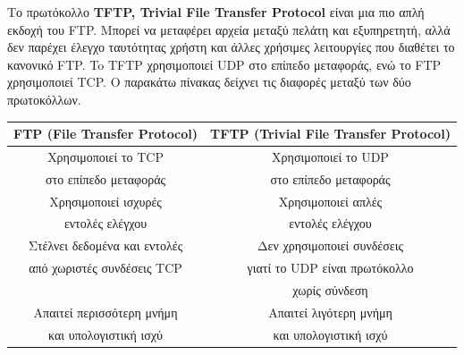 Το πρωτόκολλο \textbf{TFTP, Trivial File Transfer Protocol} είναι μια πιο απλή εκδοχή του FTP. Μπορεί να μεταφέρει αρχεία μεταξύ πελάτη και εξυπηρετητή, αλλά δεν παρέχει έλεγχο ταυτότητας χρήστη και άλλες χρήσιμες λειτουργίες που διαθέτει το κανονικό FTP. To TFTP χρησιμοποιεί UDP στο επίπεδο μεταφοράς, ενώ το FTP χρησιμοποιεί TCP. O παρακάτω πίνακας δείχνει τις διαφορές μεταξύ των δύο πρωτοκόλλων.

\begin{tabular}{|c|c|}
\hline
\textbf{FTP (File Transfer Protocol)} & \textbf{TFTP (Trivial File Transfer Protocol)} \\
\hline
Χρησιμοποιεί το TCP & Χρησιμοποιεί το UDP    \\
στο επίπεδο μεταφοράς & στο επίπεδο μεταφοράς \\
\hline
Χρησιμοποιεί ισχυρές & Χρησιμοποιεί απλές \\
 εντολές ελέγχου &  εντολές ελέγχου \\
\hline
Στέλνει δεδομένα και εντολές & Δεν χρησιμοποιεί συνδέσεις \\
από χωριστές συνδέσεις TCP   & γιατί το UDP είναι πρωτόκολλο \\
& χωρίς σύνδεση \\
\hline
Απαιτεί περισσότερη μνήμη & Απαιτεί λιγότερη μνήμη \\ 
και υπολογιστική ισχύ &  και υπολογιστική ισχύ \\
\hline
\end{tabular}